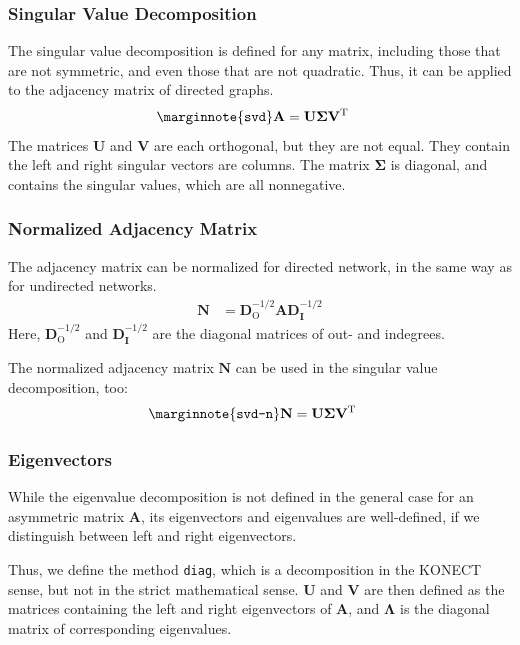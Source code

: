 \documentclass{article}
\begin{document}
\subsubsection{Singular Value Decomposition}
The singular value decomposition is defined for any matrix, including
those that are not symmetric, and even those that are not quadratic.
Thus, it can be applied to the adjacency matrix of directed graphs. 
\begin{align}
  \marginnote{\texttt{svd}}
  \mathbf A &= \mathbf U \mathbf \Sigma \mathbf V^{\mathrm T}
\end{align}
The matrices $\mathbf U$ and $\mathbf V$ are each orthogonal, but they
are not equal.  They contain the left and right singular vectors are
columns.  The matrix $\mathbf \Sigma$ is diagonal, and contains the
singular values, which are all nonnegative. 

\subsubsection{Normalized Adjacency Matrix}
The adjacency matrix can be normalized for directed network, in the same
way as for undirected networks.
\begin{align}
  \mathbf N &= \mathbf D_{\mathrm O}^{-1/2} \mathbf A \mathbf D_{\mathbf I}^{-1/2}
\end{align}
Here, $\mathbf D_{\mathrm O}^{-1/2}$ and $\mathbf D_{\mathbf I}^{-1/2}$
are the diagonal matrices of out- and indegrees. 

The normalized adjacency matrix $\mathbf N$ can be used in the singular
value decomposition, too:
\begin{align}
  \marginnote{\texttt{svd-n}}
  \mathbf N &= \mathbf U \mathbf \Sigma \mathbf V^{\mathrm T}
\end{align}

\subsubsection{Eigenvectors}
While the eigenvalue decomposition is not defined in the general case
for an asymmetric matrix $\mathbf A$, its eigenvectors and eigenvalues
are well-defined, if we distinguish between left and right
eigenvectors.

Thus, we define the method \texttt{diag}, which is a decomposition in
the KONECT sense, but not in the strict mathematical sense. 
$\mathbf U$ and $\mathbf V$ are then defined as the matrices containing
the left and right eigenvectors of $\mathbf A$, and $\mathbf \Lambda$ is
the diagonal matrix of corresponding eigenvalues. 
\end{document}
